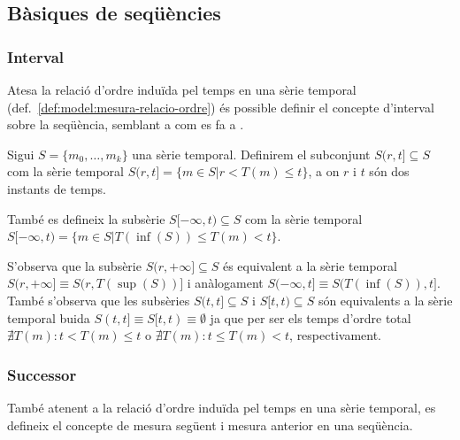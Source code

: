 \subsection{Bàsiques de seqüències}






\subsubsection{Interval}

Atesa la relació d'ordre induïda pel temps en una sèrie temporal
(def.\ \ref{def:model:mesura-relacio-ordre}) és possible definir el
concepte d'interval sobre la seqüència, semblant a com es fa a
\cite{last:keogh,last:hetland}.


\begin{definition}[Interval]
  \label{def:model:st-interval}
  Sigui $S=\{m_0, \ldots, m_k\}$ una sèrie temporal. Definirem el subconjunt
  $S(r,t] \subseteq S$ com la sèrie temporal $S(r,t]=\{m\in S
  | r<T(m)\leq t\}$, a on $r$ i $t$ són dos instants de temps.

  També es defineix la subsèrie $S[-\infty,t)\subseteq S$ com la sèrie
  temporal $S[-\infty,t) = \{m\in S | T(\inf(S))\leq T(m) < t\}$.
\end{definition}
S'observa que la subsèrie $S(r,+\infty]\subseteq S$ és
equivalent a la sèrie temporal $S(r,+\infty] \equiv S(r,T(\sup(S))]$ i
anàlogament $S(-\infty,t] \equiv S(T(\inf(S)),t]$. També s'observa que les subsèries $S(t,t]\subseteq S$ i $S[t,t)\subseteq S$ són equivalents a la sèrie temporal buida $S(t,t] \equiv S[t,t) \equiv \emptyset$ ja que per ser els temps d'ordre total $\nexists T(m): t < T(m) \leq t$ o $\nexists T(m): t \leq T(m) < t$, respectivament. 




\subsubsection{Successor}


També atenent a la relació d'ordre induïda pel temps en una sèrie temporal, es
defineix el concepte de mesura següent i mesura anterior en una
seqüència.

